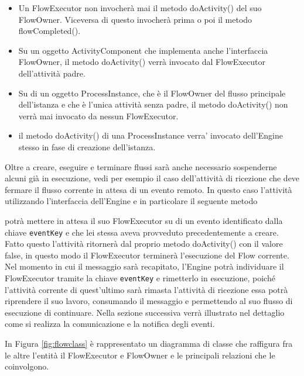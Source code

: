 \begin{itemize}
  \item Un FlowExecutor non invocherà mai il metodo doActivity() del suo
  FlowOwner. Viceversa di questo invocherà prima o poi il metodo
  flowCompleted().
  
  \item Su un oggetto ActivityComponent che implementa anche l'interfaccia
  FlowOwner, il metodo doActivity() verrà invocato dal FlowExecutor dell'attività 
  padre.
  
  \item Su di un oggetto ProcessInstance, che \`e il FlowOwner del flusso
  principale dell'istanza e che \`e l'unica attività senza padre, 
  il metodo doActivity() non verrà mai invocato da nessun FlowExecutor.
  
  \item il metodo doActivity() di una ProcessInstance verra' invocato
  dell'Engine stesso in fase di creazione dell'istanza.
  
\end{itemize}

Oltre a creare, eseguire e terminare flussi sarà anche necessario sospenderne
alcuni già in esecuzione, vedi per esempio il caso dell'attività di ricezione
che deve fermare il flusso corrente in attesa di un evento remoto. In questo
caso l'attività utilizzando l'interfaccia dell'Engine e in particolare il
seguente metodo



potrà mettere in attesa il suo FlowExecutor su di un evento identificato dalla
chiave \texttt{eventKey} e che lei stessa aveva provveduto
precedentemente a creare. Fatto questo l'attività ritornerà dal proprio metodo
doActivity() con il valore false, in questo modo il FlowExecutor terminerà
l'esecuzione del Flow corrente. Nel momento in cui il messaggio sarà recapitato,
l'Engine potrà individuare il FlowExecutor tramite la chiave \texttt{eventKey} e
rimetterlo in esecuzione, poiché l'attività corrente di quest'ultimo sarà rimasta
l'attività di ricezione essa potrà riprendere il suo lavoro, consumando il
messaggio e permettendo al suo flusso di esecuzione di continuare. Nella sezione
successiva verrà illustrato nel dettaglio come si realizza la comunicazione e la
notifica degli eventi.

In Figura \ref{fig:flowclass} \`e rappresentato un diagramma di classe che
raffigura fra le altre l'entità il FlowExecutor e FlowOwner e le principali
relazioni che le coinvolgono.

